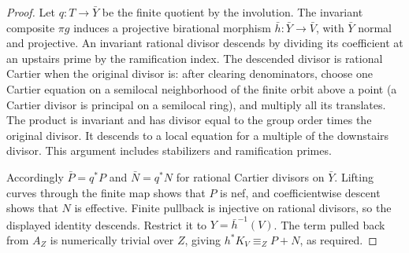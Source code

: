\begin{proof}
Let \(q:T\to\bar Y\) be the finite quotient by the involution. The invariant
composite \(\pi g\) induces a projective birational morphism
\(\bar h:\bar Y\to\bar V\), with \(\bar Y\) normal and projective. An invariant
rational divisor descends by dividing its coefficient at an upstairs prime
by the ramification index. The descended divisor is rational Cartier when
the original divisor is: after clearing denominators, choose one Cartier
equation on a semilocal neighborhood of the finite orbit above a point
(a Cartier divisor is principal on a semilocal ring), and multiply all its
translates. The product is invariant and has divisor
equal to the group order times the original divisor. It descends to a local
equation for a multiple of the downstairs divisor. This argument includes
stabilizers and ramification primes.

Accordingly \(\bar P=q^*P\) and \(\bar N=q^*N\) for rational Cartier
divisors on \(\bar Y\). Lifting curves through the finite map shows that
\(P\) is nef, and coefficientwise descent shows that \(N\) is effective.
Finite pullback is injective on rational divisors, so the displayed identity
descends. Restrict it to \(Y=\bar h^{-1}(V)\). The term pulled
back from \(A_Z\) is numerically trivial over \(Z\), giving
\(h^*K_V\equiv_ZP+N\), as required.
\end{proof}


